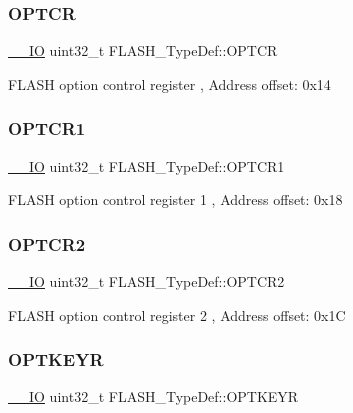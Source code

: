 \subsubsection{\texorpdfstring{OPTCR}{OPTCR}}
{\footnotesize\ttfamily \mbox{\hyperlink{core__sc300_8h_aec43007d9998a0a0e01faede4133d6be}{\+\_\+\+\_\+\+IO}} uint32\+\_\+t F\+L\+A\+S\+H\+\_\+\+Type\+Def\+::\+O\+P\+T\+CR}

F\+L\+A\+SH option control register , Address offset\+: 0x14 \mbox{\label{struct_f_l_a_s_h___type_def_a180354afdf5ff27d04befd794c46156d}} 
\subsubsection{\texorpdfstring{OPTCR1}{OPTCR1}}
{\footnotesize\ttfamily \mbox{\hyperlink{core__sc300_8h_aec43007d9998a0a0e01faede4133d6be}{\+\_\+\+\_\+\+IO}} uint32\+\_\+t F\+L\+A\+S\+H\+\_\+\+Type\+Def\+::\+O\+P\+T\+C\+R1}

F\+L\+A\+SH option control register 1 , Address offset\+: 0x18 \mbox{\label{struct_f_l_a_s_h___type_def_a175f69fa4b1d4d71c2cf5852e94a953e}} 
\subsubsection{\texorpdfstring{OPTCR2}{OPTCR2}}
{\footnotesize\ttfamily \mbox{\hyperlink{core__sc300_8h_aec43007d9998a0a0e01faede4133d6be}{\+\_\+\+\_\+\+IO}} uint32\+\_\+t F\+L\+A\+S\+H\+\_\+\+Type\+Def\+::\+O\+P\+T\+C\+R2}

F\+L\+A\+SH option control register 2 , Address offset\+: 0x1C \mbox{\label{struct_f_l_a_s_h___type_def_a793cd13a4636c9785fdb99316f7fd7ab}} 
\subsubsection{\texorpdfstring{OPTKEYR}{OPTKEYR}}
{\footnotesize\ttfamily \mbox{\hyperlink{core__sc300_8h_aec43007d9998a0a0e01faede4133d6be}{\+\_\+\+\_\+\+IO}} uint32\+\_\+t F\+L\+A\+S\+H\+\_\+\+Type\+Def\+::\+O\+P\+T\+K\+E\+YR}

